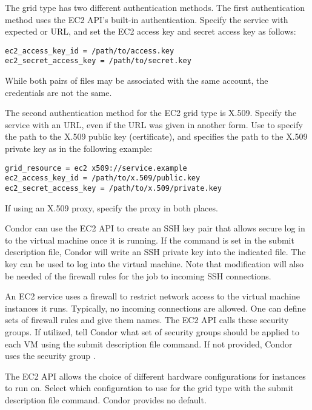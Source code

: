 The  grid type has two different authentication methods.
The first authentication method uses the EC2 API's built-in authentication.
Specify the service with expected  or  URL,
and set the EC2 access key and secret access key as follows:

\begin{verbatim}
ec2_access_key_id = /path/to/access.key
ec2_secret_access_key = /path/to/secret.key
\end{verbatim}

While both pairs of files may be associated with the same account, 
the credentials are not the same.

The second authentication method for the EC2 grid type is X.509.
Specify the service with an  URL, 
even if the URL was given in another form.  
Use  to 
specify the path to the X.509 public key (certificate),
and  specifies the path to the X.509 
private key as in the following example:

\begin{verbatim}
grid_resource = ec2 x509://service.example
ec2_access_key_id = /path/to/x.509/public.key
ec2_secret_access_key = /path/to/x.509/private.key
\end{verbatim}

If using an X.509 proxy, specify the proxy in both places.

Condor can use the EC2 API to create an SSH key pair that allows
secure log in to the virtual machine once it is running.
If the command
is set in the submit description file,
Condor will write an SSH private key into the indicated file.
The key can be used to log into the virtual machine.
Note that modification will also be needed of the firewall
rules for the job to incoming SSH connections.

An EC2 service uses a firewall to restrict network access to 
the virtual machine instances it runs.
Typically, no incoming connections are allowed.
One can define sets of firewall rules and give them names.
The EC2 API calls these security groups. 
If utilized, tell Condor what set of security
groups should be applied to each VM using the
 submit description file command.
If not provided, Condor uses the security group .

The EC2 API allows the choice of different hardware configurations 
for instances to run on.
Select which configuration to use for the  grid type
with the  submit description file command.
Condor provides no default.

